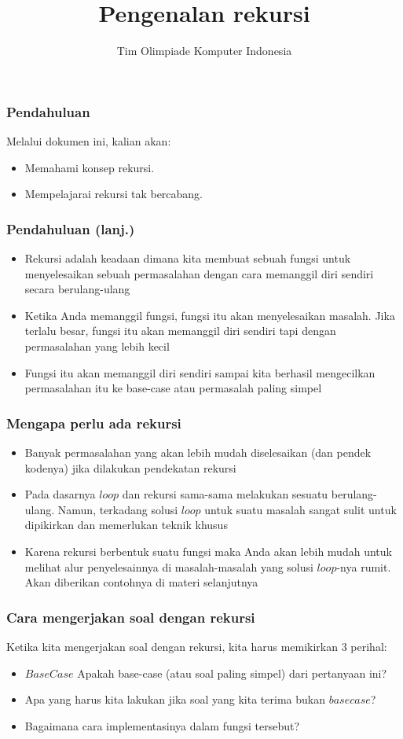 \documentclass{beamer}
\title{Pengenalan rekursi}
\author{Tim Olimpiade Komputer Indonesia}
\date{}
\begin{document}
\begin{frame}
\titlepage
\end{frame}

\begin{frame}
\frametitle{Pendahuluan}
Melalui dokumen ini, kalian akan:
\begin{itemize}
        \item Memahami konsep rekursi.
        \item Mempelajarai rekursi tak bercabang.
\end{itemize}
\end{frame}

\begin{frame}
\frametitle{Pendahuluan (lanj.) }
\begin{itemize}
        \item Rekursi adalah keadaan dimana kita membuat sebuah fungsi untuk menyelesaikan sebuah permasalahan dengan cara memanggil diri sendiri secara berulang-ulang
        \item Ketika Anda memanggil fungsi, fungsi itu akan menyelesaikan masalah. Jika terlalu besar, fungsi itu akan memanggil diri sendiri tapi dengan permasalahan yang lebih kecil
        \item Fungsi itu akan memanggil diri sendiri sampai kita berhasil mengecilkan permasalahan itu ke base-case atau permasalah paling simpel
\end{itemize}
\end{frame}

\begin{frame}
\frametitle{Mengapa perlu ada rekursi }
\begin{itemize}
    \item Banyak permasalahan yang akan lebih mudah diselesaikan (dan pendek kodenya) jika dilakukan pendekatan rekursi
    \item Pada dasarnya $loop$ dan rekursi sama-sama melakukan sesuatu berulang-ulang. Namun, terkadang solusi $loop$ untuk suatu masalah sangat sulit untuk dipikirkan dan memerlukan teknik khusus
    \item Karena rekursi berbentuk suatu fungsi maka Anda akan lebih mudah untuk melihat alur penyelesainnya di masalah-masalah yang solusi $loop$-nya rumit. Akan diberikan contohnya di materi selanjutnya
\end{itemize}
\end{frame}

\begin{frame}
\frametitle{Cara mengerjakan soal dengan rekursi }
Ketika kita mengerjakan soal dengan rekursi, kita harus memikirkan 3 perihal:
\begin{itemize}
        \item $Base Case$ Apakah base-case (atau soal paling simpel) dari pertanyaan ini?
        \item Apa yang harus kita lakukan jika soal yang kita terima bukan $base case$?
        \item Bagaimana cara implementasinya dalam fungsi tersebut?
\end{itemize}
\end{frame}
\end{document}
